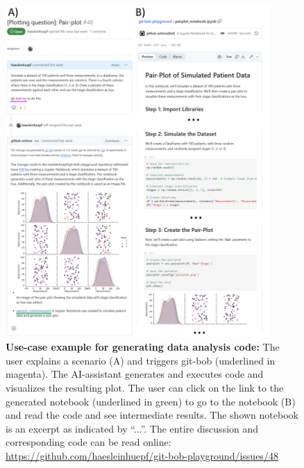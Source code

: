 \documentclass[sn-mathphys-num]{sn-jnl}%
\theoremstyle{thmstyleone}%
\theoremstyle{thmstyletwo}%
\theoremstyle{thmstylethree}%
\begin{document}
\begin{appendices}




\onecolumn
\newpage

\setcounter{figure}{0} 
\renewcommand{\figurename}{}
\renewcommand{\thefigure}{Supplementary Figure \arabic{figure}}


\begin{figure}[h]
\centering
\includegraphics[width=0.9\textwidth]{example_pair_plot.png}
\caption{\textbf{Use-case example for generating data analysis code:} The user explains a scenario (A) and triggers git-bob (underlined in magenta). The AI-assistant generates and executes code and visualizes the resulting plot. The user can click on the link to the generated notebook (underlined in green) to go to the notebook (B) and read the code and see intermediate results. The shown notebook is an excerpt as indicated by ``...''. The entire discussion and corresponding code can be read online: \url{https://github.com/haesleinhuepf/git-bob-playground/issues/48}
\newline
\newline
}
\label{fig:examplepairplot}
\end{figure}



\end{appendices}
\end{document}
